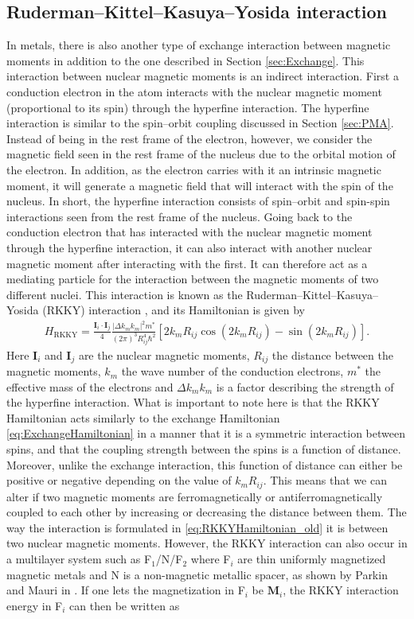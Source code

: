 \subsection{Ruderman--Kittel--Kasuya--Yosida interaction}
In metals, there is also another type of exchange interaction between magnetic moments in addition to the one described in Section \ref{sec:Exchange}. This interaction between nuclear magnetic moments is an indirect interaction. First a conduction electron in the atom interacts with the nuclear magnetic moment (proportional to its spin) through the hyperfine interaction. The hyperfine interaction is similar to the spin--orbit coupling discussed in Section \ref{sec:PMA}. Instead of being in the rest frame of the electron, however, we consider the magnetic field seen in the rest frame of the nucleus due to the orbital motion of the electron. In addition, as the electron carries with it an intrinsic magnetic moment, it will generate a magnetic field that will interact with the spin of the nucleus. In short, the hyperfine interaction consists of spin--orbit and spin-spin interactions seen from the rest frame of the nucleus. Going back to the conduction electron that has interacted with the nuclear magnetic moment through the hyperfine interaction, it can also interact with another nuclear magnetic moment after interacting with the first. It can therefore act as a mediating particle for the interaction between the magnetic moments of two different nuclei. This interaction is known as the Ruderman--Kittel--Kasuya--Yosida (RKKY) interaction \cite{RudermanKittel1954, Kasuya1956, Yosida1957, Vleck1962}, and its Hamiltonian is given by
\begin{align}
    \label{eq:RKKYHamiltonian_old}
    H_{\text{RKKY}} = \frac{\mathbold{I}_i\cdot\mathbold{I}_j}{4}\frac{|\Delta k_m k_m|^2m^*}{(2\pi)^3 R_{ij}^4 \hbar^2} \left[2k_mR_{ij}\cos\left(2k_mR_{ij}\right) - \sin \left(2k_mR_{ij}\right)\right].
\end{align}
Here $\mathbold{I}_i$ and $\mathbold{I}_j$ are the nuclear magnetic moments, $R_{ij}$ the distance between the magnetic moments, $k_m$ the wave number of the conduction electrons, $m^*$ the effective mass of the electrons and $\Delta k_m k_m$ is a factor describing the strength of the hyperfine interaction. What is important to note here is that the RKKY Hamiltonian acts similarly to the exchange Hamiltonian \eqref{eq:ExchangeHamiltonian} in a manner that it is a symmetric interaction between spins, and that the coupling strength between the spins is a function of distance. Moreover, unlike the exchange interaction, this function of distance can either be positive or negative depending on the value of $k_mR_{ij}$. This means that we can alter if two magnetic moments are ferromagnetically or antiferromagnetically coupled to each other by increasing or decreasing the distance between them. The way the interaction is formulated in \eqref{eq:RKKYHamiltonian_old} it is between two nuclear magnetic moments. However, the RKKY  interaction can also occur in a multilayer system such as F$_1$/N/F$_2$ where F$_i$ are thin uniformly magnetized magnetic metals and N is a non-magnetic metallic spacer, as shown by Parkin and Mauri in \cite{Parkin1991}. If one lets the magnetization in F$_i$ be $\mathbold{M}_i$, the RKKY interaction energy in F$_i$ can then be written as
